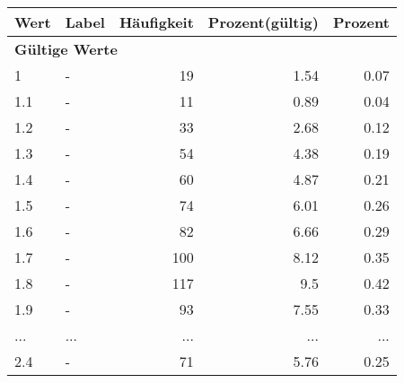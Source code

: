      \begin{longtable}{lXrrr}
     \toprule
     \textbf{Wert} & \textbf{Label} & \textbf{Häufigkeit} & \textbf{Prozent(gültig)} & \textbf{Prozent} \\
     \endhead
     \midrule
     \multicolumn{5}{l}{\textbf{Gültige Werte}}\\
        1 & \multicolumn{1}{X}{-} & %
          \num{19} &
          \num[round-mode=places,round-precision=2]{1,54} &
          \num[round-mode=places,round-precision=2]{0,07} \\
        1.1 & \multicolumn{1}{X}{-} & %
          \num{11} &
          \num[round-mode=places,round-precision=2]{0,89} &
          \num[round-mode=places,round-precision=2]{0,04} \\
        1.2 & \multicolumn{1}{X}{-} & %
          \num{33} &
          \num[round-mode=places,round-precision=2]{2,68} &
          \num[round-mode=places,round-precision=2]{0,12} \\
        1.3 & \multicolumn{1}{X}{-} & %
          \num{54} &
          \num[round-mode=places,round-precision=2]{4,38} &
          \num[round-mode=places,round-precision=2]{0,19} \\
        1.4 & \multicolumn{1}{X}{-} & %
          \num{60} &
          \num[round-mode=places,round-precision=2]{4,87} &
          \num[round-mode=places,round-precision=2]{0,21} \\
        1.5 & \multicolumn{1}{X}{-} & %
          \num{74} &
          \num[round-mode=places,round-precision=2]{6,01} &
          \num[round-mode=places,round-precision=2]{0,26} \\
        1.6 & \multicolumn{1}{X}{-} & %
          \num{82} &
          \num[round-mode=places,round-precision=2]{6,66} &
          \num[round-mode=places,round-precision=2]{0,29} \\
        1.7 & \multicolumn{1}{X}{-} & %
          \num{100} &
          \num[round-mode=places,round-precision=2]{8,12} &
          \num[round-mode=places,round-precision=2]{0,35} \\
        1.8 & \multicolumn{1}{X}{-} & %
          \num{117} &
          \num[round-mode=places,round-precision=2]{9,5} &
          \num[round-mode=places,round-precision=2]{0,42} \\
        1.9 & \multicolumn{1}{X}{-} & %
          \num{93} &
          \num[round-mode=places,round-precision=2]{7,55} &
          \num[round-mode=places,round-precision=2]{0,33} \\
       ... & ... & ... & ... & ... \\
        2.4 & \multicolumn{1}{X}{-} & %
          \num{71} &
          \num[round-mode=places,round-precision=2]{5,76} &
          \num[round-mode=places,round-precision=2]{0,25} \\


\end{longtable}
